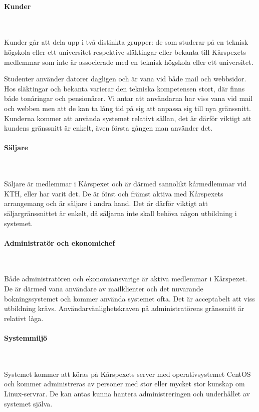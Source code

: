 \documentclass[a4paper, twoside, 11pt, titlepage]{article}
\begin{document}
			\paragraph{Kunder}\

			Kunder går att dela upp i två distinkta grupper: de som studerar på en teknisk högskola eller ett universitet respektive släktingar eller bekanta till Kårspexets medlemmar som inte är associerade med en teknisk högskola eller ett universitet.

			Studenter använder datorer dagligen och är vana vid både mail och webbsidor. Hos släktingar och bekanta varierar den tekniska kompetensen stort, där finns både tonåringar och pensionärer. Vi antar att användarna har viss vana vid mail och webben men att de kan ta lång tid på sig att anpassa sig till nya gränssnitt. Kunderna kommer att använda systemet relativt sällan, det är därför viktigt att kundens gränssnitt är enkelt, även första gången man använder det.

			\paragraph{Säljare}\

			Säljare är medlemmar i Kårspexet och är därmed sannolikt kårmedlemmar vid KTH, eller har varit det. De är först och främst aktiva med Kårspexets arrangemang och är säljare i andra hand. Det är därför viktigt att säljargränssnittet är enkelt, då säljarna inte skall behöva någon utbildning i systemet.

			\paragraph{Administratör och ekonomichef}\

			Både administratören och ekonomiansvarige är aktiva medlemmar i Kårspexet. De är därmed vana användare av mailklienter och det nuvarande bokningssystemet och kommer använda systemet ofta. Det är acceptabelt att viss utbildning krävs. Användarvänlighetskraven på administratörens gränssnitt är relativt låga.

			\paragraph{Systemmiljö}\

			Systemet kommer att köras på Kårspexets server med operativsystemet CentOS och kommer administreras av personer med stor eller mycket stor kunskap om Linux-servrar. De kan antas kunna hantera administreringen och underhållet av systemet själva.
\end{document}
